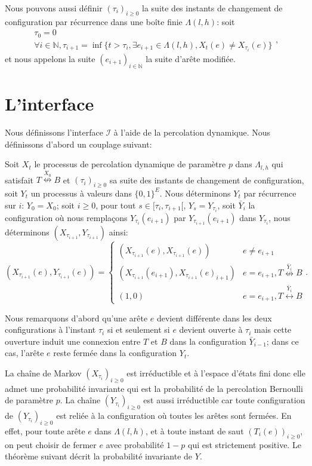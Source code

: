 \documentclass[titlepage,a4paper,12pt]{article}
\begin{document}
Nous pouvons aussi définir $(\tau_i)_{i\geqslant 0}$ la suite des instants de changement de configuration par récurrence dans une boîte finie $\Lambda(l,h)$: soit $$\left.
\begin{array}{l}
\tau_0 = 0 \\
\forall i\in \mathbb{N},\tau_{i+1} = \inf \{ t>\tau_i, \exists e_{i+1} \in \Lambda(l,h), X_t(e) \neq X_{\tau_i}(e)\}
\end{array}\right.,$$
et nous appelons la suite $(e_{i+1})_{i\in\mathbb{N}}$ la suite d'arête modifiée.
\section{L'interface}
Nous définissons l'interface $\mathcal{I}$ à l'aide de la percolation dynamique. Nous définissons d'abord un couplage suivant:

Soit $X_t$ le processus de percolation dynamique de paramètre $p$ dans $\Lambda_{l,h}$ qui satisfait $T\overset{X_0}{\nleftrightarrow}B$ et $(\tau_i)_{i\geqslant 0}$ sa suite des instants de changement de configuration, soit $Y_t$ un processus à valeurs dans $\{0,1\}^E$. Nous déterminons $Y_t$ par récurrence sur $i$: $Y_0=X_0$; soit $i\geqslant 0$, pour tout $s\in [\tau_i, \tau_{i+1}[$, $Y_s = Y_{\tau_i}$, soit $\bar{Y}_i$ la configuration où nous remplaçons $Y_{\tau_i}(e_{i+1})$ par $Y_{\tau_{i+1}}(e_{i+1})$ dans $Y_{\tau_i}$, nous déterminons $(X_{\tau_{i+1}},Y_{\tau_{i+1}})$ ainsi:
$$(X_{\tau_{i+1}}(e),Y_{\tau_{i+1}}(e))=\left\lbrace \begin{array}{cc}
(X_{\tau_{i+1}}(e),X_{\tau_{i+1}}(e)) & e \neq e_{i+1}\\
(X_{\tau_{i+1}}(e_{i+1}),X_{\tau_{i+1}}(e)_{i+1}) & e = e_{i+1}, T \overset{\bar{Y}_i}{\nleftrightarrow} B \\
(1,0) & e = e_{i+1},T\overset{\bar{Y}_i}{\leftrightarrow} B 
\end{array}\right..$$

Nous remarquons d'abord qu'une arête $e$ devient différente dans les deux configurations à l'instant $\tau_i$ si et seulement si $e$ devient ouverte à $\tau_i$ mais cette ouverture induit une connexion entre $T$ et $B$ dans la configuration $\bar{Y}_{i-1}$; dans ce cas, l'arête $e$ reste fermée dans la configuration $Y_t$. 

La chaîne de Markov $(X_{\tau_i})_{i\geqslant 0}$ est irréductible et à l'espace d'états fini donc elle admet une probabilité invariante qui est la probabilité de la percolation Bernoulli de paramètre $p$. La chaîne $(Y_{\tau_i})_{i\geqslant 0}$ est aussi irréductible car toute configuration de $(Y_{\tau_i})_{i\geqslant 0}$ est reliée à la configuration où toutes les arêtes sont fermées. En effet, pour toute arête $e$ dans $\Lambda(l,h)$, et à toute instant de saut $(T_i(e))_{i\geqslant 0}$, on peut choisir de fermer $e$ avec probabilité $1-p$ qui est strictement positive. Le théorème suivant décrit la probabilité invariante de $Y$.
\end{document}
